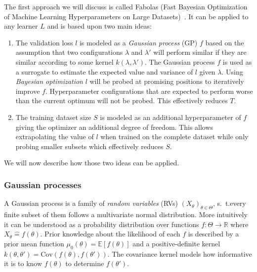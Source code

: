 The first approach we will discuss is called Fabolas (Fast Bayesian Optimization of Machine Learning Hyperparameters on Large Datasets)~\cite{Klein2016}.
It can be applied to any learner \(L\) and is based upon two main ideas:
\begin{enumerate}
	\item The validation loss \(l\) is modeled as a \textit{Gaussian process} (GP) \(f\) based on the assumption that two configurations \(\lambda\) and \(\lambda'\) will perform similar if they are similar according to some kernel \(k(\lambda, \lambda')\).
		The Gaussian process \(f\) is used as a surrogate to estimate the expected value and variance of \(l\) given \(\lambda\).
		Using \textit{Bayesian optimization} \(l\) will be probed at promising positions to iteratively improve \(f\).
		Hyperparameter configurations that are expected to perform worse than the current optimum will not be probed.
		This effectively reduces \(T\).
	\item The training dataset size \(S\) is modeled as an additional hyperparameter of \(f\) giving the optimizer an additional degree of freedom.
		This allows extrapolating the value of \(l\) when trained on the complete dataset while only probing smaller subsets
		which effectively reduces \(S\).
\end{enumerate}
We will now describe how those two ideas can be applied.

\subsubsection{Gaussian processes}%
\label{sec:hyperparams:fabolas:gaussian}

A Gaussian process is a family of \textit{random variables} (RVs) \({(X_\theta)}_{\theta \in \Theta}\), s.~t.\@ every finite subset of them follows a multivariate normal distribution.
More intuitively it can be understood as a probability distribution over functions \(f: \Theta \to \mathbb{R}\) where \(X_\theta \mathrel{\widehat{=}} f(\theta)\).
Prior knowledge about the likelihood of each \(f\) is described by a prior mean function \(\mu_0(\theta) = \mathbb{E}[f(\theta)]\) and a positive-definite kernel \(k(\theta, \theta') = \mathrm{Cov}(f(\theta), f(\theta'))\).
The covariance kernel models how informative it is to know \(f(\theta)\) to determine \(f(\theta')\).

